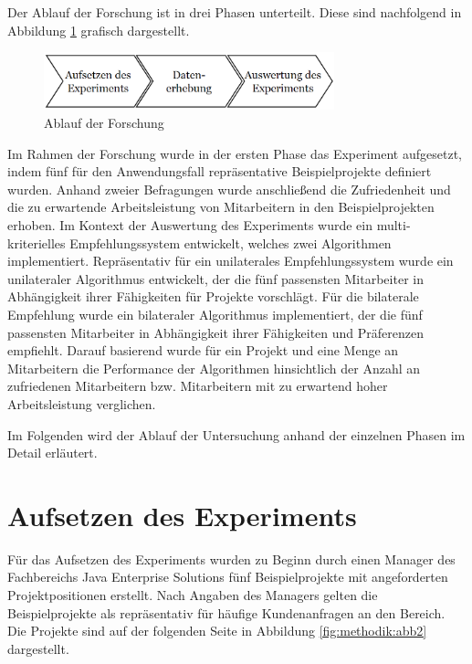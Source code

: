 Der Ablauf der Forschung ist in drei Phasen unterteilt.
Diese sind nachfolgend in Abbildung \ref{fig:methodik:abb1} grafisch dargestellt.

\begin{figure}[H]
    \centering
	\includegraphics[width=0.75\textwidth]{gfx/prozess-forschung.png}
	\caption[Ablauf der Forschung]{Ablauf der Forschung}
	\label{fig:methodik:abb1}
\end{figure}

Im Rahmen der Forschung wurde in der ersten Phase das Experiment aufgesetzt, indem fünf für den Anwendungsfall repräsentative Beispielprojekte definiert wurden.
Anhand zweier Befragungen wurde anschließend die Zufriedenheit und die zu erwartende Arbeitsleistung von Mitarbeitern in den Beispielprojekten erhoben.
Im Kontext der Auswertung des Experiments wurde ein multi-kriterielles Empfehlungssystem entwickelt, welches zwei Algorithmen implementiert.
Repräsentativ für ein unilaterales Empfehlungssystem wurde ein unilateraler Algorithmus entwickelt, der die fünf passensten Mitarbeiter in Abhängigkeit ihrer Fähigkeiten für Projekte vorschlägt.
Für die bilaterale Empfehlung wurde ein bilateraler Algorithmus implementiert, der die fünf passensten Mitarbeiter in Abhängigkeit ihrer Fähigkeiten und Präferenzen empfiehlt.
Darauf basierend wurde für ein Projekt und eine Menge an Mitarbeitern die Performance der Algorithmen hinsichtlich der Anzahl an zufriedenen Mitarbeitern bzw. Mitarbeitern mit zu erwartend hoher Arbeitsleistung verglichen.

Im Folgenden wird der Ablauf der Untersuchung anhand der einzelnen Phasen im Detail erläutert.

\section{Aufsetzen des Experiments}
Für das Aufsetzen des Experiments wurden zu Beginn durch einen Manager des Fachbereichs Java Enterprise Solutions fünf Beispielprojekte mit angeforderten Projektpositionen erstellt.
Nach Angaben des Managers gelten die Beispielprojekte als repräsentativ für häufige Kundenanfragen an den Bereich.
Die Projekte sind auf der folgenden Seite in Abbildung \ref{fig:methodik:abb2} dargestellt.


